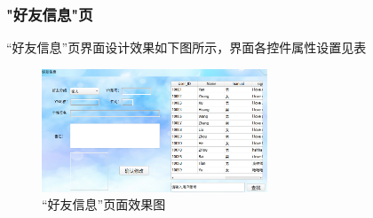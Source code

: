 \documentclass{progartcn}
\begin{document}
\subsubsection{"好友信息"页}

“好友信息”页界面设计效果如下图所示，界面各控件属性设置见表

\begin{figure}[H]
	\centering
	\includegraphics[width=0.6\textwidth]{8.png}
	\caption{\centering  “好友信息”页面效果图}
\end{figure}
\end{document}
